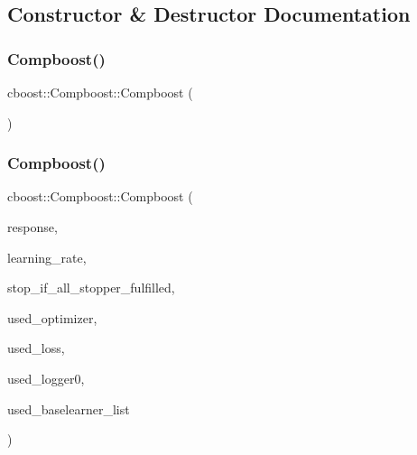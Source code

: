 \subsection{Constructor \& Destructor Documentation}
\mbox{\label{classcboost_1_1_compboost_a5117b7b8cf0a424e736f6833bc5c3a68}} 
\subsubsection{\texorpdfstring{Compboost()}{Compboost()}\hspace{0.1cm}{\footnotesize\ttfamily [1/2]}}
{\footnotesize\ttfamily cboost\+::\+Compboost\+::\+Compboost (\begin{DoxyParamCaption}{ }\end{DoxyParamCaption})}

\mbox{\label{classcboost_1_1_compboost_a24b98d64e9aac2a7a8ec4e64a49a1f7c}} 
\subsubsection{\texorpdfstring{Compboost()}{Compboost()}\hspace{0.1cm}{\footnotesize\ttfamily [2/2]}}
{\footnotesize\ttfamily cboost\+::\+Compboost\+::\+Compboost (\begin{DoxyParamCaption}\item[{const arma\+::vec \&}]{response,  }\item[{const double \&}]{learning\+\_\+rate,  }\item[{const bool \&}]{stop\+\_\+if\+\_\+all\+\_\+stopper\+\_\+fulfilled,  }\item[{\mbox{\hyperlink{classoptimizer_1_1_optimizer}{optimizer\+::\+Optimizer}} $\ast$}]{used\+\_\+optimizer,  }\item[{\mbox{\hyperlink{classloss_1_1_loss}{loss\+::\+Loss}} $\ast$}]{used\+\_\+loss,  }\item[{\mbox{\hyperlink{classloggerlist_1_1_logger_list}{loggerlist\+::\+Logger\+List}} $\ast$}]{used\+\_\+logger0,  }\item[{\mbox{\hyperlink{classblearnerlist_1_1_baselearner_factory_list}{blearnerlist\+::\+Baselearner\+Factory\+List}}}]{used\+\_\+baselearner\+\_\+list }\end{DoxyParamCaption})}

